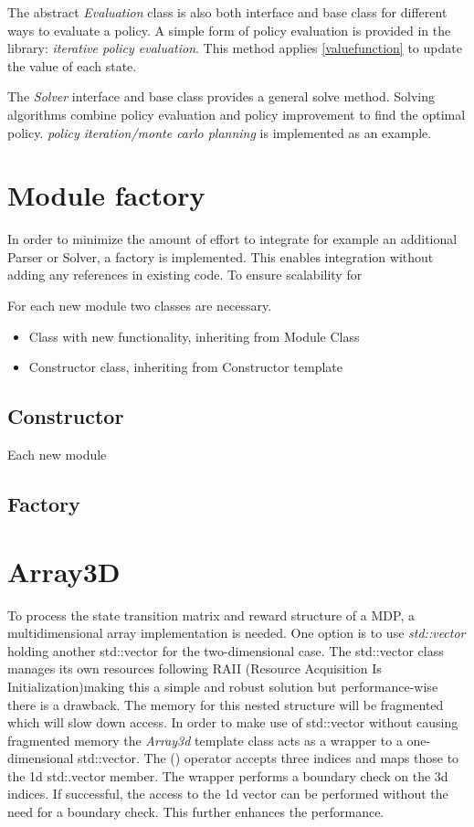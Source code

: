 The abstract \emph{Evaluation} class is also both interface and base class for different ways to evaluate a policy. A simple form of policy evaluation is provided in the library: \emph{iterative policy evaluation}. This method applies \autoref{valuefunction} to update the value of each state. 

The \emph{Solver} interface and base class provides a general solve method. Solving algorithms combine policy evaluation and policy improvement to find the optimal policy. \emph{policy iteration/monte carlo planning} is implemented as an example.

\section{Module factory}
\label{integration}

In order to minimize the amount of effort to integrate for example an additional Parser or Solver, a factory is implemented. This enables integration without adding any references in existing code. To ensure scalability for 

For each new module two classes are necessary.

\begin{itemize}
	\item Class with new functionality, inheriting from Module Class
	\item Constructor class, inheriting from Constructor template
\end{itemize}

\subsection{Constructor}
Each new module 


\subsection{Factory}


\section{Array3D}

To process the state transition matrix and reward structure of a MDP, a multidimensional array implementation is needed. One option is to use \emph{std::vector} holding another std::vector for the two-dimensional case. The std::vector class manages its own resources following RAII (Resource Acquisition Is Initialization)making this a simple and robust solution but performance-wise there is a drawback. The memory for this nested structure will be fragmented which will slow down access. 
In order to make use of std::vector without causing fragmented memory the \emph{Array3d} template class acts as a wrapper to a one-dimensional std::vector. The () operator accepts three indices and maps those to the 1d std:.vector member. The wrapper performs a boundary check on the 3d indices. If successful, the access to the 1d vector can be performed without the need for a boundary check. This further enhances the performance.  

